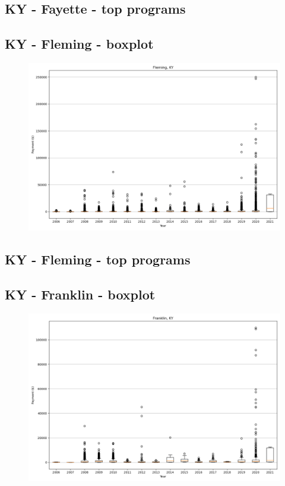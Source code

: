 \subsection*{KY - Fayette - top programs}

\newpage
\subsection*{KY - Fleming - boxplot}
\begin{figure}[h]
\centering
\includegraphics[width=7in]{../output/boxplots/counties/Fleming-KY_boxplot.png}
\end{figure}


\subsection*{KY - Fleming - top programs}

\newpage
\subsection*{KY - Franklin - boxplot}
\begin{figure}[h]
\centering
\includegraphics[width=7in]{../output/boxplots/counties/Franklin-KY_boxplot.png}
\end{figure}


